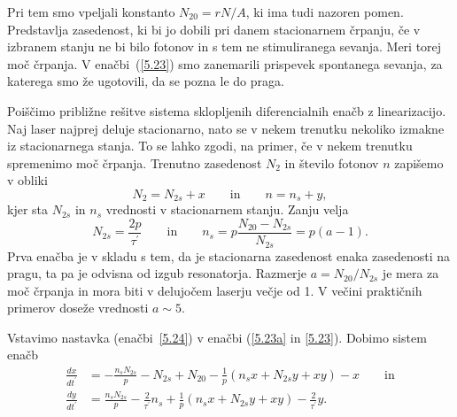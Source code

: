 Pri tem smo vpeljali konstanto $N_{20}= rN/A$, ki ima tudi nazoren pomen.
Predstavlja zasedenost, ki bi jo dobili pri danem stacionarnem črpanju, če v
izbranem stanju ne bi bilo fotonov in s tem ne stimuliranega sevanja. Meri torej 
moč črpanja. V enačbi~(\ref{5.23})
smo zanemarili prispevek spontanega sevanja, za katerega smo že ugotovili,
da se pozna le do praga.

Poiščimo približne rešitve sistema sklopljenih diferencialnih enačb z 
linearizacijo. Naj laser najprej deluje stacionarno, nato se v nekem trenutku  
nekoliko izmakne iz stacionarnega stanja. To se lahko zgodi, na primer, če v nekem 
trenutku spremenimo moč črpanja. Trenutno zasedenost $N_2$ in število fotonov $n$
zapišemo v obliki 
\begin{equation}  
N_2= N_{2s}+x \qquad \mathrm{in} \qquad n=n_s+y,
\label{5.24}
\end{equation}
kjer sta $N_{2s}$ in $n_s$ vrednosti v stacionarnem stanju. Zanju velja 
\begin{equation}  
N_{2s}=\frac{2p}{\tau^{\prime}}\qquad \mathrm{in}\qquad  
n_s=p\frac{N_{20}-N_{2s}}{N_{2s}}=p(a-1).
\label{5.26}
\end{equation}
Prva enačba je v skladu s tem, da je stacionarna zasedenost 
enaka zasedenosti na pragu, ta pa je odvisna od izgub resonatorja. 
Razmerje $a=N_{20}/N_{2s}$ je mera za moč črpanja in
mora biti v delujočem laserju večje od 1. V večini praktičnih primerov
doseže vrednosti $a \sim 5$.

Vstavimo nastavka (enačbi~\ref{5.24}) v enačbi (\ref{5.23a} in \ref{5.23}). 
Dobimo sistem enačb
\begin{align}  
\frac{d x}{d t^{\prime}} &=-\frac{n_sN_{2s}}{p}-N_{2s}+N_{20}- \frac{1}{p}
(n_sx+N_{2s}y+xy)-x \qquad \mathrm{in}\\
\frac{d y}{d t^{\prime}} &= \frac{n_sN_{2s}}{p}-\frac{2}{\tau^{\prime}}n_s
+ \frac{1}{p}(n_s x+N_{2s} y+xy)-\frac{2}{\tau^{\prime}}y.
\label{5.27}
\end{align}

